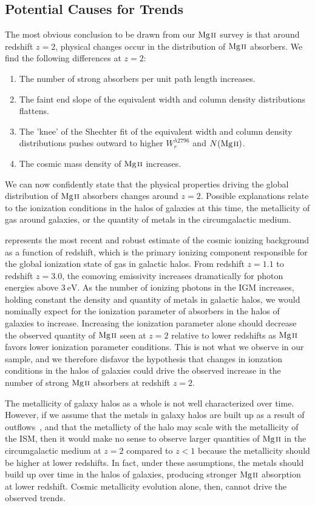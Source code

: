 \documentclass[iop,apj,numberedappendix,appendixfloats,twocolappendix]{emulateapj}
\begin{document}
\subsection{Potential Causes for Trends}
\label{trendcauses}

The most obvious conclusion to be drawn from our ${\hbox{{\rm Mg}\kern 0.1em{\sc ii}}}$ survey is that around redshift $z = 2$, physical changes occur in the distribution of ${\hbox{{\rm Mg}\kern 0.1em{\sc ii}}}$ absorbers. We find the following differences at $z = 2$:
\begin{enumerate}
\item The number of strong absorbers per unit path length increases.
\item The faint end slope of the equivalent width and column density distributions flattens.
\item The 'knee' of the Shechter fit of the equivalent width and column density distributions pushes outward to higher $W_r^{\lambda2796}$ and $N(\hbox{{\rm Mg}\kern 0.1em{\sc ii}})$.
\item The cosmic mass density of ${\hbox{{\rm Mg}\kern 0.1em{\sc ii}}}$ increases.
\end{enumerate}
\noindent We can now confidently state that the physical properties driving the global distribution of ${\hbox{{\rm Mg}\kern 0.1em{\sc ii}}}$ absorbers changes around $z = 2$. Possible explanations relate to the ionization conditions in the halos of galaxies at this time, the metallicity of gas around galaxies, or the quantity of metals in the circumgalactic medium.

\cite{Haardt2012} represents the most recent and robust estimate of the cosmic ionizing background as a function of redshift, which is the primary ionizing component responsible for the global ionization state of gas in galactic halos. From redshift $z = 1.1$ to redshift $z = 3.0$, the comoving emissivity increases dramatically for photon energies above $3~\mathrm{eV}$. As the number of ionizing photons in the IGM increases, holding constant the density and quantity of metals in galactic halos, we would nominally expect for the ionization parameter of absorbers in the halos of galaxies to increase. Increasing the ionization parameter alone should decrease the observed quantity of ${\hbox{{\rm Mg}\kern 0.1em{\sc ii}}}$ seen at $z = 2$ relative to lower redshifts as ${\hbox{{\rm Mg}\kern 0.1em{\sc ii}}}$ favors lower ionization parameter conditions. This is not what we observe in our sample, and we therefore disfavor the hypothesis that changes in ionzation conditions in the halos of galaxies could drive the observed increase in the number of strong ${\hbox{{\rm Mg}\kern 0.1em{\sc ii}}}$ absorbers at redshift $z = 2$. 

The metallicity of galaxy halos as a whole is not well characterized over time. However, if we assume that the metals in galaxy halos are built up as a result of outflows~\citep{Quiret2016}, and that the metallicty of the halo may scale with the metallicity of the ISM, then it would make no sense to observe larger quantities of ${\hbox{{\rm Mg}\kern 0.1em{\sc ii}}}$ in the circumgalactic medium at $z = 2$ compared to $z < 1$ because the metallicity should be higher at lower redshifts. In fact, under these assumptions, the metals should build up over time in the halos of galaxies, producing stronger ${\hbox{{\rm Mg}\kern 0.1em{\sc ii}}}$ absorption at lower redshift. Cosmic metallicity evolution alone, then, cannot drive the observed trends.
\end{document}
